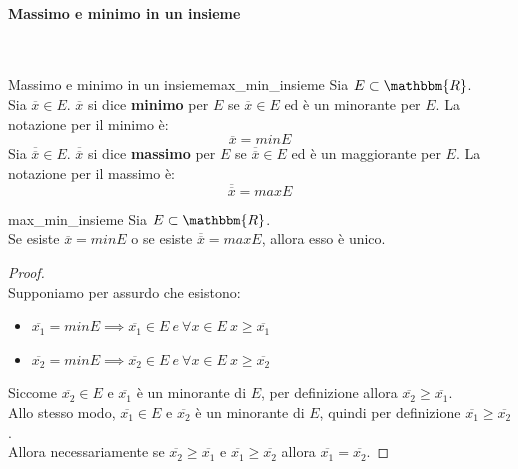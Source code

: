 \documentclass[12pt]{report}
\newcounter{theorem}
\newcounter{definition}
\newcommand{\nmu}{}
\begin{document}
	\paragraph{Massimo e minimo in un insieme} \quad \\
	\begin{definition}{\nmu Massimo e minimo in un insieme}{max_min_insieme}
		Sia $E \subset \mathbbm{R}$. \\
		Sia $\overline{x} \in E$. $\overline{x}$ si dice \textbf{minimo} per $E$ se $\overline{x} \in E$ ed è un minorante per $E$. La notazione per il minimo è:
		\[
		\overline{x} = minE
		\]
		Sia $\overline{\overline{x}} \in E$. $\overline{\overline{x}}$ si dice \textbf{massimo} per $E$ se $\overline{\overline{x}} \in E$ ed è un maggiorante per $E$. La notazione per il massimo è:
		\[
		\overline{\overline{x}} = maxE
		\]
	\end{definition}
	\begin{theorem}{}{max_min_insieme}
		Sia $E \subset \mathbbm{R}$. \\
		Se esiste $\overline{x} = minE$ o se esiste $\overline{\overline{x}} = maxE$, allora esso è unico.
		\begin{proof} \quad \\
			Supponiamo per assurdo che esistono:
			\begin{itemize}
				\item $\overline{x_1} = minE \implies \overline{x_1} \in E \ e \ \forall x \in E \ x \geq \overline{x_1}$
				\item $\overline{x_2} = minE \implies \overline{x_2} \in E \ e \ \forall x \in E \ x \geq \overline{x_2}$
			\end{itemize}
			Siccome $\overline{x_2} \in E$ e $\overline{x_1}$ è un minorante di $E$, per definizione allora $\overline{x_2} \geq \overline{x_1}$. \\
			Allo stesso modo, $\overline{x_1} \in E$ e $\overline{x_2}$ è un minorante di $E$, quindi per definizione $\overline{x_1} \geq \overline{x_2}$. \\
			Allora necessariamente se $\overline{x_2} \geq \overline{x_1}$ e $\overline{x_1} \geq \overline{x_2}$ allora $\overline{x_1} = \overline{x_2}$.
		\end{proof}
	\end{theorem}
\end{document}
